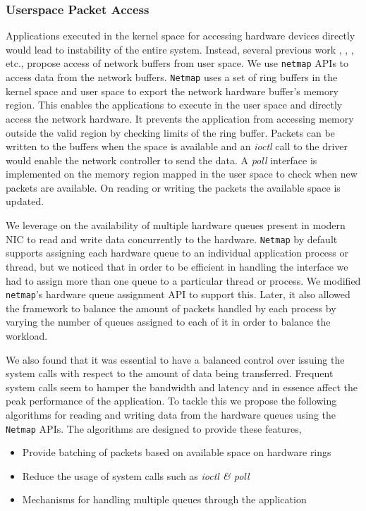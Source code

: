 \documentclass[conference]{IEEEtran}
\begin{document}
\subsubsection{Userspace Packet Access}
Applications executed in the kernel space for accessing hardware devices directly would lead to instability of the entire system. Instead, several previous work \cite{Rizzo:2012:RNI:2090147.2103536}, \cite{1564468}, \cite{Krasnyansky}, etc., propose access of network buffers from user space. We use \texttt{netmap} APIs \cite{Rizzo:2012:RNI:2090147.2103536} to access data from the network buffers. \texttt{Netmap} uses a set of ring buffers in the kernel space and user space to export the network hardware buffer's memory region. This enables the applications to execute in the user space and directly access the network hardware. It prevents the application from accessing memory outside the valid region by checking limits of the ring buffer. Packets can be written to the buffers when the space is available and an \textit{ioctl} call to the driver would enable the network controller to send the data. A \textit{poll} interface is implemented on the memory region mapped in the user space to check when new packets are available. On reading or writing the packets the available space is updated. 

We leverage on the availability of multiple hardware queues present in modern NIC to read and write data concurrently to the hardware. \texttt{Netmap} by default supports assigning each hardware queue to an individual application process or thread, but we noticed that in order to be efficient in handling the interface we had to assign more than one queue to a particular thread or process. We modified \texttt{netmap}'s hardware queue assignment API to support this. Later, it also allowed the framework to balance the amount of packets handled by each process by varying the number of queues assigned to each of it in order to balance the workload.

We also found that it was essential to have a balanced control over issuing the system calls with respect to the amount of data being transferred. Frequent system calls seem to hamper the bandwidth and latency and in essence affect the peak performance of the application. To tackle this we propose the following algorithms for reading and writing data from the hardware queues using the \texttt{Netmap} APIs. The algorithms are designed to provide these features,

\begin{itemize}

\item Provide batching of packets based on available space on hardware rings
\item Reduce the usage of system calls such as \textit{ioctl \& poll}
\item Mechanisms for handling multiple queues through the application

\end{itemize}
\end{document}
